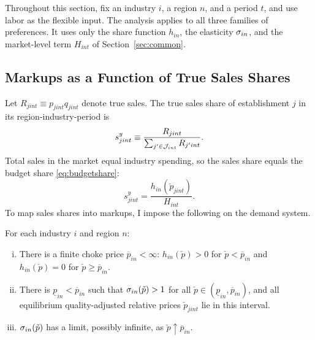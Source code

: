 Throughout this section, fix an industry $i$, a region $n$, and a period $t$, and use labor as the flexible input.
The analysis applies to all three families of preferences.
It uses only the share function $h_{in}$, the elasticity $\sigma_{in}$, and the market-level term $H_{int}$ of Section~\ref{sec:common}.

\subsection{Markups as a Function of True Sales Shares}\label{sec:mushares}

Let $R_{jint} \equiv p_{jint} q_{jint}$ denote true sales.
The true sales share of establishment $j$ in its region-industry-period is
\begin{equation}\label{eq:share}
	s^y_{jint} \equiv \frac{R_{jint}}{\sum_{j' \in {\cal J}_{int}} R_{j'int}}.
\end{equation}
Total sales in the market equal industry spending, so the sales share equals the budget share \eqref{eq:budgetshare}:
\begin{equation}\label{eq:sharex}
	s^y_{jint} = \frac{h_{in}\left(\check{p}_{jint}\right)}{H_{int}}.
\end{equation}
To map sales shares into markups, I impose the following on the demand system.

\label{assum:choke}
For each industry $i$ and region $n$:
\begin{enumerate}[(i)]
	\item There is a finite choke price $\overline{p}_{in} < \infty$: $h_{in}(\check{p}) > 0$ for $\check{p} < \overline{p}_{in}$ and $h_{in}(\check{p}) = 0$ for $\check{p} \geq \overline{p}_{in}$.
	\item There is $\underline{p}_{in} < \overline{p}_{in}$ such that $\sigma_{in}(\check{p}) > 1$ for all $\check{p} \in (\underline{p}_{in}, \overline{p}_{in})$, and all equilibrium quality-adjusted relative prices $\check{p}_{jint}$ lie in this interval.
	\item $\sigma_{in}(\check{p})$ has a limit, possibly infinite, as $\check{p} \uparrow \overline{p}_{in}$.
\end{enumerate}
\eassu

